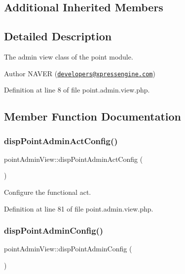 \subsection*{Additional Inherited Members}


\subsection{Detailed Description}
The admin view class of the point module. 

\begin{DoxyAuthor}{Author}
N\+A\+V\+ER (\href{mailto:developers@xpressengine.com}{\tt developers@xpressengine.\+com}) 
\end{DoxyAuthor}


Definition at line 8 of file point.\+admin.\+view.\+php.



\subsection{Member Function Documentation}
\hypertarget{classpointAdminView_a26806618247648a89db0c1af0a02918e}{}\label{classpointAdminView_a26806618247648a89db0c1af0a02918e} 
\subsubsection{\texorpdfstring{disp\+Point\+Admin\+Act\+Config()}{dispPointAdminActConfig()}}
{\footnotesize\ttfamily point\+Admin\+View\+::disp\+Point\+Admin\+Act\+Config (\begin{DoxyParamCaption}{ }\end{DoxyParamCaption})}



Configure the functional act. 



Definition at line 81 of file point.\+admin.\+view.\+php.

\hypertarget{classpointAdminView_a5e73a90049fb98faea8d3074c513da31}{}\label{classpointAdminView_a5e73a90049fb98faea8d3074c513da31} 
\subsubsection{\texorpdfstring{disp\+Point\+Admin\+Config()}{dispPointAdminConfig()}}
{\footnotesize\ttfamily point\+Admin\+View\+::disp\+Point\+Admin\+Config (\begin{DoxyParamCaption}{ }\end{DoxyParamCaption})}



